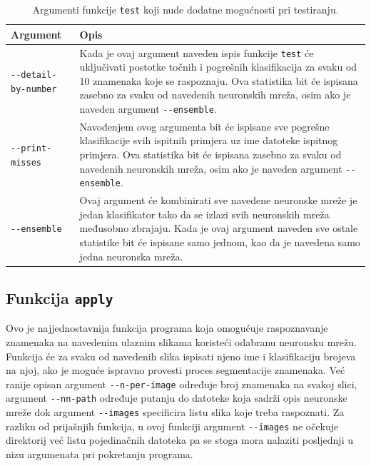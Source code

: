 \begin{table}[!htb]
    \caption{Argumenti funkcije \texttt{test} koji nude dodatne mogućnosti pri testiranju.}
    \label{tab:test-args}
    \scriptsize
    \centering
    \begin{tabular}{|M{3.5cm}|M{8.5cm}|}
        \hline
        Argument & Opis \\
        \hline
        \texttt{-{}-detail-by-number} & Kada je ovaj argument naveden ispis funkcije \texttt{test} će uključivati
        postotke točnih i pogrešnih klasifikacija za svaku od 10 znamenaka koje se raspoznaju. Ova statistika bit će
        ispisana zasebno za svaku od navedenih neuronskih mreža, osim ako je naveden argument \texttt{-{}-ensemble}. \\
        \hline
        \texttt{-{}-print-misses} & Navođenjem ovog argumenta bit će ispisane sve pogrešne klasifikacije svih ispitnih
        primjera uz ime datoteke ispitnog primjera. Ova statistika bit će ispisana zasebno za svaku od navedenih
        neuronskih mreža, osim ako je naveden argument \texttt{-{}-ensemble}. \\
        \hline
        \texttt{-{}-ensemble} & Ovaj argument će kombinirati sve navedene neuronske mreže je jedan klasifikator tako da
        se izlazi svih neuronskih mreža međusobno zbrajaju. Kada je ovaj argument naveden sve ostale statistike bit će
        ispisane samo jednom, kao da je navedena samo jedna neuronska mreža. \\
        \hline
    \end{tabular}
\end{table}

\subsection{Funkcija \texttt{apply}}
\label{subsec:funkcija-apply}
Ovo je najjednostavnija funkcija programa koja omogućuje raspoznavanje znamenaka na navedenim ulaznim slikama koristeći
odabranu neuronsku mrežu. Funkcija će za svaku od navedenih slika ispisati njeno ime i klasifikaciju brojeva na njoj,
ako je moguće ispravno provesti proces segmentacije znamenaka. Već ranije opisan argument \texttt{-{}-n-per-image}
određuje broj znamenaka na svakoj slici, argument \texttt{-{}-nn-path} određuje putanju do datoteke koja sadrži opis
neuronske mreže dok argument \texttt{-{}-images} specificira listu slika koje treba raspoznati. Za razliku od prijašnjih
funkcija, u ovoj funkciji argument \texttt{-{}-images} ne očekuje direktorij već listu pojedinačnih datoteka pa se
stoga mora nalaziti posljednji u nizu argumenata pri pokretanju programa.
